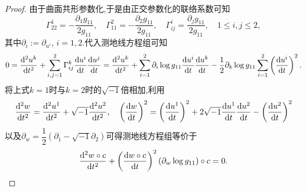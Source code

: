 	\begin{proof}
		由于曲面共形参数化,于是由正交参数化的联络系数可知
		$$
		\Gamma_{22}^{1}=-\frac{\partial_{1}g_{11}}{2g_{11}},\quad \Gamma_{11}^{2}=-\frac{\partial_{2}g_{11}}{2g_{11}},\quad \Gamma_{ij}^{i}=\frac{\partial_{j}g_{11}}{2g_{11}},\quad 1\leqslant i,j\leqslant 2,
		$$
		其中$\partial_{i}:=\partial_{u^{i}}$, $i=1,2$.代入测地线方程组可知
		$$
			0=\frac{\mathrm{d}^{2}u^{k}}{\mathrm{d} t^{2}}+\sum_{i,j=1}^{2}\Gamma_{ij}^{k}\frac{\mathrm{d} u^{i}}{\mathrm{d} t}\frac{\mathrm{d} u^{j}}{\mathrm{d} t}=\frac{\mathrm{d}^{2}u^{k}}{\mathrm{d} t^{2}}+\sum_{i=1}^{2}\partial_{i}\log g_{11}\frac{\mathrm{d} u^{i}}{\mathrm{d} t}\frac{\mathrm{d} u^{k}}{\mathrm{d} t}-\frac{1}{2}\partial_{k}\log g_{11}\sum_{i=1}^{2}\left(\frac{\mathrm{d} u^{i}}{\mathrm{d} t}\right)^{2}.
		$$
		将上式$k=1$时与$k=2$时的$\sqrt{-1}$倍相加,利用
		$$
		\frac{\mathrm{d}^{2} w}{\mathrm{d} t^{2}}=\frac{\mathrm{d}^{2} u^{1}}{\mathrm{d} t^{2}}+\sqrt{-1}\frac{\mathrm{d}^{2} u^{2}}{\mathrm{d} t^{2}},\quad \left(\frac{\mathrm{d} w}{\mathrm{d} t}\right)^{2}=\left(\frac{\mathrm{d} u^{1}}{\mathrm{d} t}\right)^{2}+2\sqrt{-1}\frac{\mathrm{d} u^{1}}{\mathrm{d} t}\frac{\mathrm{d} u^{2}}{\mathrm{d} t}-\left(\frac{\mathrm{d} u^{2}}{\mathrm{d} t}\right)^{2}
		$$
		以及$\partial_{w}=\dfrac{1}{2}(\partial_{1}-\sqrt{-1}\partial_{2})$可得测地线方程组等价于
		$$
		\frac{\mathrm{d}^{2}w\circ c}{\mathrm{d} t^{2}}+\left( \frac{\mathrm{d} w\circ c}{\mathrm{d} t} \right)^{2}(\partial_{w}\log g_{11})\circ c=0.\qedhere
		$$
	\end{proof}

